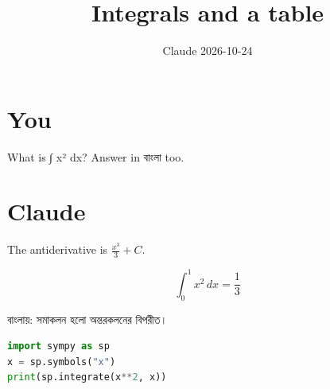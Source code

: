 \documentclass[11pt,a4paper]{article}
\title{Integrals and a table}
\date{Claude \textperiodcentered{} 2026-10-24}
\begin{document}
\maketitle

\section*{You}

What is ∫ x² dx? Answer in বাংলা too.


\section*{Claude}

The antiderivative is $\frac{x^3}{3} + C$.

\[
\int_0^1 x^2\,dx = \frac{1}{3}
\]

বাংলায়: সমাকলন হলো অন্তরকলনের বিপরীত।

\begin{lstlisting}[language=python]
import sympy as sp
x = sp.symbols("x")
print(sp.integrate(x**2, x))
\end{lstlisting}

\begin{center}
\end{center}
\end{document}
